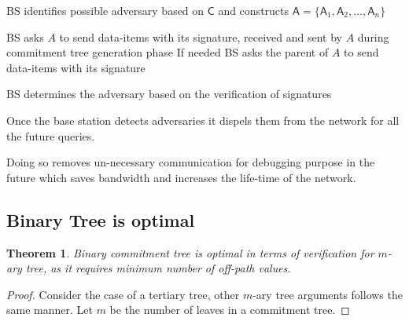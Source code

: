 \documentclass[%
  slidesonly,%
  semlayer%
  ]{seminar}                                  %
\newtheorem{theorem}{Theorem}
\begin{document}
\begin{slide}
\begin{algorithm}
\begin{algorithmic}[1]
            \ENDFOR

            \STATE BS identifies possible adversary based on $\textsf{C}$ and constructs $\textsf{A} = \{\textsf{A}_{1},\textsf{A}_{2},\dotsc,\textsf{A}_{n}\}$


              \STATE BS asks $A$ to send data-items with its signature, received and sent by $A$ during commitment tree generation phase
              \STATE If needed BS  asks the parent of $A$ to send data-items with its signature
        
            \ENDFOR

            \STATE BS determines the adversary based on the verification of signatures

          \end{algorithmic}
        \end{algorithm}

        Once the base station detects adversaries it dispels them from the network for all the future queries.

        Doing so removes un-necessary communication for debugging purpose in the future which saves bandwidth and increases the life-time of the network.        
        \vfill
        \clearpage

      \subsection*{Binary Tree is optimal}
        \begin{theorem}
          Binary commitment tree is optimal in terms of verification for $m$-ary tree, as it requires minimum number of off-path values.
        \end{theorem}
        \begin{proof}
          Consider the case of a tertiary tree, other $m$-ary tree arguments follows the same manner.
          Let $m$ be the number of leaves in a commitment tree.
          

\end{proof}
\end{slide}
\end{document}
